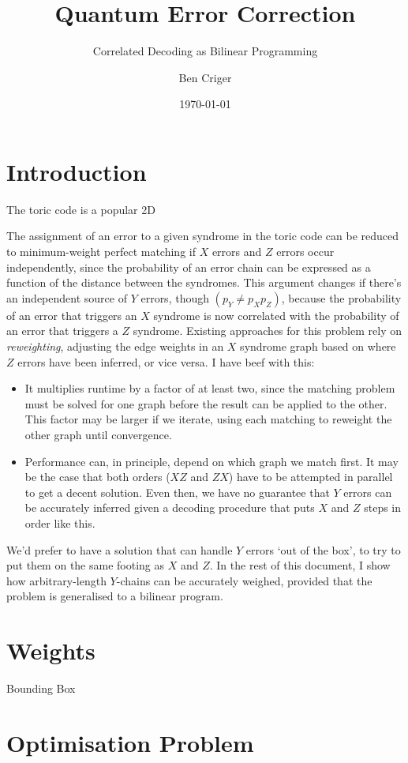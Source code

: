\documentclass[a4paper, english]{scrartcl}
\title{Quantum Error Correction}
\subtitle{Correlated Decoding as Bilinear Programming}
\author{Ben Criger}
\date{\today}
\begin{document}
\maketitle
\section{Introduction}
The toric code is a popular 2D 

The assignment of an error to a given syndrome in the toric code can be reduced to minimum-weight perfect matching if $X$ errors and $Z$ errors occur independently, since the probability of an error chain can be expressed as a function of the distance between the syndromes. 
This argument changes if there's an independent source of $Y$ errors, though $(p_Y \neq p_X p_Z)$, because the probability of an error that triggers an $X$ syndrome is now correlated with the probability of an error that triggers a $Z$ syndrome.
Existing approaches for this problem \cite{Fowler, DelfosseTillich} rely on \emph{reweighting}, adjusting the edge weights in an $X$ syndrome graph based on where $Z$ errors have been inferred, or vice versa. 
I have beef with this:
\begin{itemize}
\item It multiplies runtime by a factor of at least two, since the matching problem must be solved for one graph before the result can be applied to the other. 
This factor may be larger if we iterate, using each matching to reweight the other graph until convergence.
\item Performance can, in principle, depend on which graph we match first. It may be the case that both orders ($XZ$ and $ZX$) have to be attempted in parallel to get a decent solution. 
Even then, we have no guarantee that $Y$ errors can be accurately inferred given a decoding procedure that puts $X$ and $Z$ steps in order like this. 
\end{itemize}
We'd prefer to have a solution that can handle $Y$ errors `out of the box', to try to put them on the same footing as $X$ and $Z$. 
In the rest of this document, I show how arbitrary-length $Y$-chains can be accurately weighed, provided that the problem is generalised to a bilinear program. 
\section{Weights}
Bounding Box
\section{Optimisation Problem}


\end{document}
